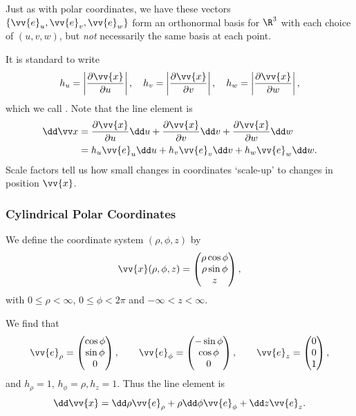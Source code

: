 Just as with polar coordinates, we have these vectors $\{\vv{e}_u, \vv{e}_v, \vv{e}_w\}$ form an orthonormal basis for $\R^3$ with each choice of $(u, v, w)$, but \emph{not} necessarily the same basis at each point.

It is standard to write
$$
h_u = \left|\frac{\partial \vv{x}}{\partial u}\right|,
\quad h_v = \left|\frac{\partial \vv{x}}{\partial v}\right|,
\quad h_w = \left|\frac{\partial \vv{x}}{\partial w}\right|,
$$
which we call . Note that the line element is
\begin{align*}
	\dd \vv x &= \frac{\partial \vv{x}}{\partial u} \dd u
	+ \frac{\partial \vv{x}}{\partial v} \dd v
	+ \frac{\partial \vv{x}}{\partial w} \dd w \\
	&= h_u \vv{e}_u \dd u  + h_v \vv{e}_v \dd v  + h_w \vv{e}_w \dd w.
\end{align*}
Scale factors tell us how small changes in coordinates `scale-up' to changes in position $\vv{x}$.

\subsubsection{Cylindrical Polar Coordinates}

We define the coordinate system $(\rho, \phi, z)$ by
$$
\vv{x}(\rho, \phi, z) = \begin{pmatrix}
	\rho \cos \phi \\
	\rho \sin \phi \\
	z
\end{pmatrix},
$$
with $0 \leq \rho < \infty$, $0 \leq \phi < 2 \pi$ and $- \infty < z < \infty$.

We find that
$$
\vv{e}_{\rho} = \begin{pmatrix}
	\cos \phi \\
	\sin \phi \\ 0
\end{pmatrix}, \quad \quad \vv{e}_{\phi} = \begin{pmatrix}
	-\sin \phi \\
	\cos \phi \\
	0
\end{pmatrix}, \quad \quad \vv{e}_z = \begin{pmatrix}
	0 \\ 0 \\ 1
\end{pmatrix},
$$
and $h_\rho = 1$, $h_{\phi} = \rho, h_z = 1$. Thus the line element is
$$
\dd \vv{x} = \dd \rho \vv{e}_\rho + \rho \dd \phi \vv{e}_\phi
 + \dd z \vv{e}_z.
 $$


